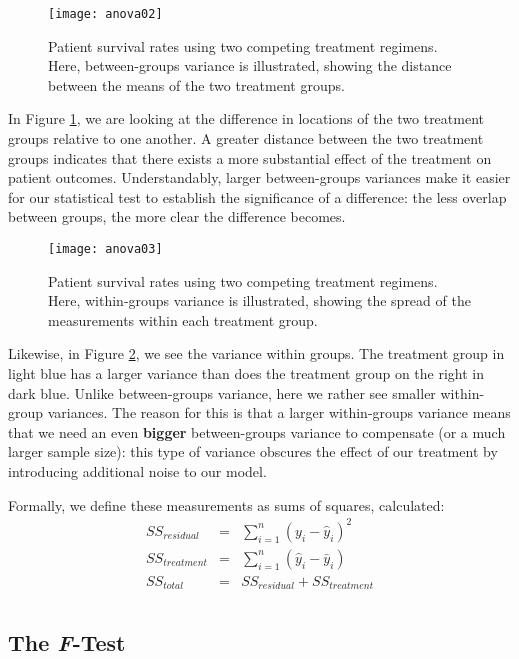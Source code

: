 \begin{figure}[h]
\texttt{[image: anova02]}
\label{fig:anova02}
\caption{Patient survival rates using two competing treatment regimens. Here, between-groups variance is illustrated, showing the distance between the means of the two treatment groups.}
\end{figure}

In Figure \ref{fig:anova02}, we are looking at the difference in locations of the two treatment groups relative to one another. A greater distance between the two treatment groups indicates that there exists a more substantial effect of the treatment on patient outcomes. Understandably, larger between-groups variances make it easier for our statistical test to establish the significance of a difference: the less overlap between groups, the more clear the difference becomes.

\begin{figure}[h]
\texttt{[image: anova03]}
\label{fig:anova03}
\caption{Patient survival rates using two competing treatment regimens. Here, within-groups variance is illustrated, showing the spread of the measurements within each treatment group.}
\end{figure}

Likewise, in Figure \ref{fig:anova03}, we see the variance within groups. The treatment group in light blue has a larger variance than does the treatment group on the right in dark blue. Unlike between-groups variance, here we rather see smaller within-group variances. The reason for this is that a larger within-groups variance means that we need an even \textbf{bigger} between-groups variance to compensate (or a much larger sample size): this type of variance obscures the effect of our treatment by introducing additional noise to our model.

Formally, we define these measurements as sums of squares, calculated:
\begin{eqnarray*}
SS_{residual} &=& \sum_{i=1}^n \left(y_i - \hat{y}_i\right)^2 \\
SS_{treatment} &=& \sum_{i=1}^n \left(\hat{y}_i-\bar{y}_i\right) \\
SS_{total} &=& SS_{residual}+SS_{treatment} \\
\end{eqnarray*}

\subsection{The \textit{F}-Test}

